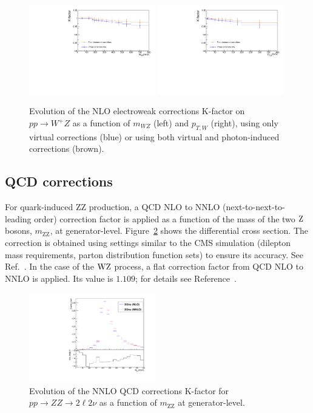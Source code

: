 \begin{figure}[!hbtp]
  \centering
  \includegraphics[width=0.49\textwidth]{figures/WZ_NLOEW_mWZ_ULB.pdf}
  \includegraphics[width=0.49\textwidth]{figures/WZ_NLOEW_pTW_ULB.pdf}
  \caption{Evolution of the NLO electroweak corrections K-factor on $pp \to W^+Z$ as a function of $m_{WZ}$ (left) and $p_{T,W}$ (right), using only virtual corrections (blue) or using both virtual and photon-induced corrections (brown).
  \label{fig:gammaInduced_WZ}}
\end{figure}

\subsection{QCD corrections}
For quark-induced ZZ production, a QCD NLO to NNLO (next-to-next-to-leading order)
correction factor is applied as a function of the mass of the two $\mathrm{Z}$ bosons,
$m_\mathrm{ZZ}$, at generator-level.
Figure~\ref{fig:NNLO_QCD_corrections} shows the differential cross section.
The correction is obtained using settings similar to the CMS simulation (dilepton mass requirements,
parton distribution function sets) to ensure its accuracy. See Ref.~\cite{Grazzini:2015hta}.
In the case of the $\mathrm{W}\mathrm{Z}$ process, a flat correction factor from QCD NLO to NNLO is applied.
Its value is $\mathbf{1.109}$; for details see Reference~\cite{Grazzini:2016swo}.


\begin{figure}[htp]
  \centering
  \includegraphics[width=0.49\textwidth]{figures/ZZ_NNLO_QCD_corrections.pdf} 
  \caption{Evolution of the NNLO QCD corrections K-factor for $pp \to ZZ \to 2\ell2\nu$ as a function of $m_\mathrm{ZZ}$ at generator-level.} 
  \label{fig:NNLO_QCD_corrections}
\end{figure} 

